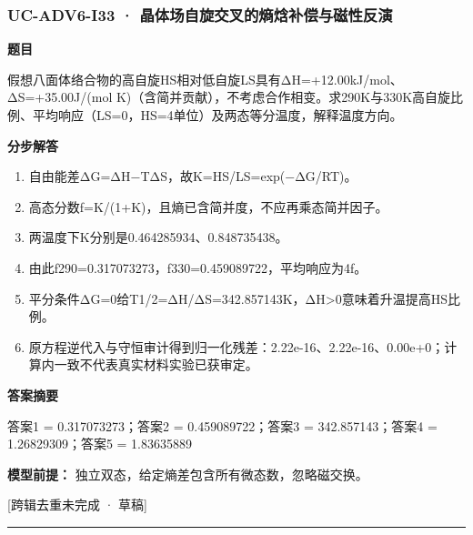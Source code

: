 \documentclass[UTF8,11pt,a4paper]{ctexart}
\begin{document}
\subsubsection*{UC-ADV6-I33 · 晶体场自旋交叉的熵焓补偿与磁性反演}
\noindent\textbf{题目}\par
假想八面体络合物的高自旋HS相对低自旋LS具有ΔH=+12.00kJ/mol、ΔS=+35.00J/(mol K)（含简并贡献），不考虑合作相变。求290K与330K高自旋比例、平均响应（LS=0，HS=4单位）及两态等分温度，解释温度方向。\par
\medskip\noindent\textbf{分步解答}
\begin{enumerate}
\item 自由能差ΔG=ΔH−TΔS，故K=HS/LS=exp(−ΔG/RT)。
\item 高态分数f=K/(1+K)，且熵已含简并度，不应再乘态简并因子。
\item 两温度下K分别是0.464285934、0.848735438。
\item 由此f290=0.317073273，f330=0.459089722，平均响应为4f。
\item 平分条件ΔG=0给T1/2=ΔH/ΔS=342.857143K，ΔH>0意味着升温提高HS比例。
\item 原方程逆代入与守恒审计得到归一化残差：2.22e-16、2.22e-16、0.00e+0；计算内一致不代表真实材料实验已获审定。
\end{enumerate}
\noindent\textbf{答案摘要}\par
答案1 = 0.317073273；答案2 = 0.459089722；答案3 = 342.857143；答案4 = 1.26829309；答案5 = 1.83635889\par
\noindent\textbf{模型前提：}
独立双态，给定熵差包含所有微态数，忽略磁交换。\par
\noindent\textcolor{red!65!black}{[跨辑去重未完成 · 草稿]} \par
\medskip\hrule\medskip
{}
\end{document}
